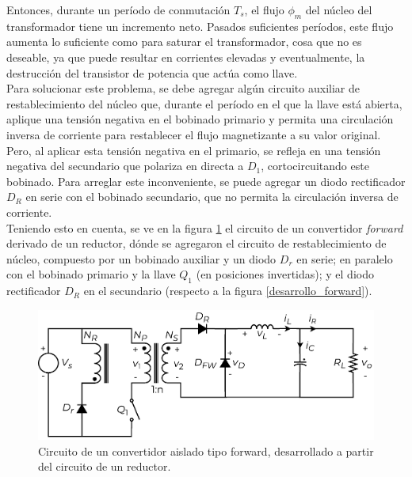 Entonces, durante un período de conmutación $T_s$, el flujo $\phi_m$ del núcleo del transformador tiene un incremento neto. Pasados suficientes períodos, este flujo aumenta lo suficiente como para saturar el transformador, cosa que no es deseable, ya que puede resultar en corrientes elevadas y eventualmente, la destrucción del transistor de potencia que actúa como llave.\\

Para solucionar este problema, se debe agregar algún circuito auxiliar de restablecimiento del núcleo que, durante el período en el que la llave está abierta, aplique una tensión negativa en el bobinado primario y permita una circulación inversa de corriente para restablecer el flujo magnetizante a su valor original.\\

Pero, al aplicar esta tensión negativa en el primario, se refleja en una tensión negativa del secundario que polariza en directa a $D_1$, cortocircuitando este bobinado. Para arreglar este inconveniente, se puede agregar un diodo rectificador $D_R$ en serie con el bobinado secundario, que no permita la circulación inversa de corriente.\\

Teniendo esto en cuenta, se ve en la figura \ref{forward} el circuito de un {\Medium convertidor \textit{forward}} derivado de un reductor, dónde se agregaron el circuito de restablecimiento de núcleo, compuesto por un bobinado auxiliar y un diodo $D_r$ en serie; en paralelo con el bobinado primario y la llave $Q_1$ (en posiciones invertidas); y el diodo rectificador $D_R$ en el secundario (respecto a la figura \ref{desarrollo_forward}).\\

\begin{figure}[h]
    \centering
    \includegraphics[scale=0.6]{Imagenes/Forward.pdf}
    \caption{Circuito de un convertidor aislado tipo forward, desarrollado a partir del circuito de un reductor.}
    \label{forward}
\end{figure}

